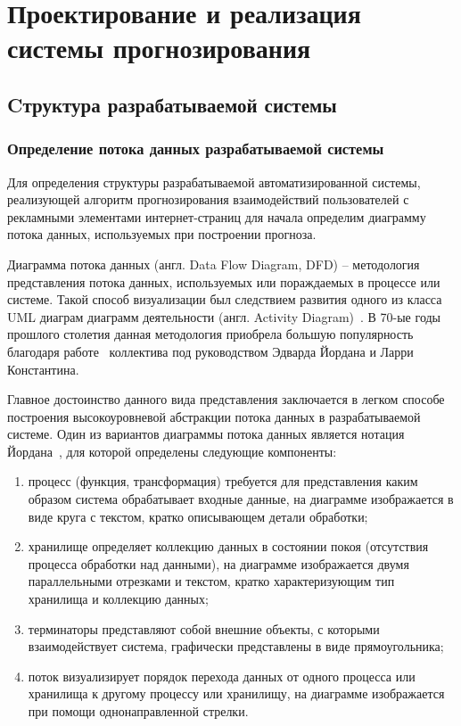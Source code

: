 \section{Проектирование и реализация системы прогнозирования}
\subsection{Cтруктура разрабатываемой системы}
\subsubsection{Определение потока данных разрабатываемой системы}
Для определения структуры разрабатываемой автоматизированной системы, реализующей алгоритм прогнозирования взаимодействий
пользователей с рекламными элементами интернет-страниц для начала определим диаграмму потока данных, используемых при
построении прогноза.

Диаграмма потока данных (англ. Data Flow Diagram, DFD) -- методология представления потока данных, используемых или
пораждаемых в процессе или системе. Такой способ визуализации был следствием развития одного из класса UML диаграм
диаграмм деятельности (англ. Activity Diagram)~\autocite{impl:ad}. В 70-ые годы прошлого столетия данная методология
приобрела большую популярность благодаря работе~\autocite{impl:dfd} коллектива под руководством Эдварда Йордана и
Ларри Константина.

Главное достоинство данного вида представления заключается в легком способе построения высокоуровневой абстракции
потока данных в разрабатываемой системе. Один из вариантов диаграммы потока данных является нотация 
Йордана~\autocite{impl:yourdan}, для которой определены следующие компоненты:
\begin{enumerate}
    \item процесс (функция, трансформация) требуется для представления каким образом система обрабатывает 
    входные данные, на диаграмме изображается в виде круга с текстом, кратко описывающем детали обработки;
    \item хранилище определяет коллекцию данных в состоянии покоя (отсутствия процесса обработки над данными),
    на диаграмме изображается двумя параллельными отрезками и текстом, кратко характеризующим тип хранилища и
    коллекцию данных; 
    \item терминаторы представляют собой внешние объекты, с которыми взаимодействует система, графически представлены
    в виде прямоугольника;
    \item поток визуализирует порядок перехода данных от одного процесса или хранилища к другому процессу или
    хранилищу, на диаграмме изображается при помощи однонаправленной стрелки.
\end{enumerate}

